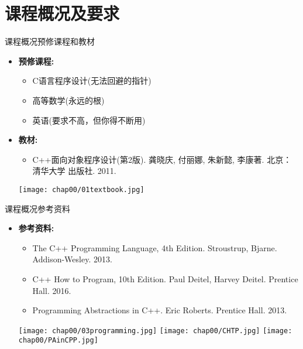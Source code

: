 \section[课程概况]{课程概况及要求}\label{sec:chap00-sec02}
\begin{frame}{课程概况}{预修课程和教材}
  \stretchon
  \begin{itemize}
  \item{} {\bfseries 预修课程:}
    \begin{itemize}
    \item C语言程序设计(无法回避的\alert{指针})
    \item 高等数学(永远的\alert{根})
    \item 英语(要求不高，但你得\alert{不断用})
    \end{itemize}\pause         
  \item{} {\bfseries 教材:}
    \begin{itemize}
    \item C++面向对象程序设计(第2版). 龚晓庆, 付丽娜, 朱新懿, 李康著. 北京：清华大学
      出版社. 2011.
    \end{itemize}
    \centering
    \texttt{[image: chap00/01textbook.jpg]} %
  \end{itemize}
  \stretchoff
\end{frame}

\begin{frame}{课程概况}{参考资料}
  \stretchon
  \begin{itemize}
  \item{} {\bfseries 参考资料:}    
    \begin{itemize}
    \item The C++ Programming Language, 4th Edition. Stroustrup,
      Bjarne. Addison-Wesley. 2013.
    \item C++ How to Program, 10th Edition. Paul Deitel, Harvey
      Deitel. Prentice Hall. 2016.
    \item Programming Abstractions in C++. Eric Roberts. Prentice Hall. 2013.
    \end{itemize}
    \centering
    \texttt{[image: chap00/03programming.jpg]} %
    \quad \texttt{[image: chap00/CHTP.jpg]} %
    \quad \texttt{[image: chap00/PAinCPP.jpg]} %
  \end{itemize}
  \stretchoff
\end{frame}

